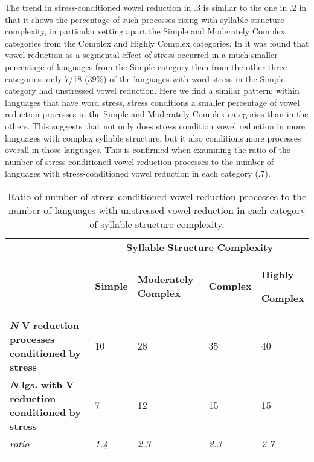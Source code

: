   The trend in stress-conditioned vowel reduction in .3 is similar to the one in .2 in that it shows the percentage of such processes rising with syllable structure complexity, in particular setting apart the Simple and Moderately Complex categories from the Complex and Highly Complex categories. In  it was found that vowel reduction as a segmental effect of stress occurred in a much smaller percentage of languages from the Simple category than from the other three categories: only 7/18 (39\%) of the languages with word stress in the Simple category had unstressed vowel reduction. Here we find a similar pattern: within languages that have word stress, stress conditions a smaller percentage of vowel reduction processes in the Simple and Moderately Complex categories than in the others. This suggests that not only does stress condition vowel reduction in more languages with complex syllable structure, but it also conditions more processes overall in those languages. This is confirmed when examining the ratio of the number of stress-conditioned vowel reduction processes to the number of languages with stress-conditioned vowel reduction in each category (.7).






\begin{table}
\begin{tabularx}{\textwidth}{XXXXX}
\lsptoprule
 & \multicolumn{4}{c}{ \textbf{Syllable} \textbf{Structure} \textbf{Complexity}}\\
& \textbf{Simple} & \textbf{Moderately} \textbf{Complex} & \textbf{Complex} & { \textbf{Highly} }

 \textbf{Complex}\\
 \textbf{\textit{N}} \textbf{V} \textbf{reduction} \textbf{processes} \textbf{conditioned} \textbf{by} \textbf{stress} & 10 & 28 & 35 & 40\\
 \textbf{\textit{N}} \textbf{lgs.} \textbf{with} \textbf{V} \textbf{reduction} \textbf{conditioned} \textbf{by} \textbf{stress} & 7 & 12 & 15 & 15\\
 \textit{ratio} & \textit{1.4} & \textit{2.3} & \textit{2.3} & \textit{2.7}\\
\lspbottomrule
\end{tabularx}
\caption{\label{6.7}Ratio of number of stress-conditioned vowel reduction processes to the number of languages with unstressed vowel reduction in each category of syllable structure complexity.}
\end{table}




